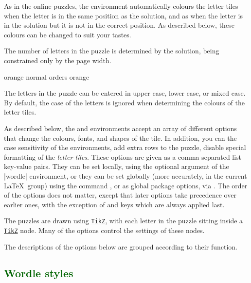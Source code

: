 \documentclass[svgnames]{report}
\newcommand\ctan[1]{\href{https://www.ctan.org/pkg/#1}{\texttt{#1}}}
\newcommand\Section[1]{\subsection{\textcolor{DarkGreen}{#1}}}
\begin{document}
  As in the online puzzles, the  environment
  automatically colours the letter tiles
  when the letter is in the same position as the solution, and as
   when
  the letter is in the solution but it is not in the correct position. As
  described below, these colours can be changed to suit your tastes.

  The number of letters in the puzzle is determined by the solution,
  being constrained only by the page width.

  \begin{example}
  \begin{wordle}[rows=4]{orange}
     normal
     orders
     orange
  \end{wordle}
  \end{example}

  The letters in the puzzle can be entered in upper case, lower case, or
  mixed case. By default, the case of the letters is ignored when
  determining the colours of the letter tiles.

  As described below, the  and 
  environments accept an array of different options that change the
  colours, fonts, and shapes of the tile. In addition, you can the case
  sensitivity of the environments, add extra rows to the puzzle, disable
  special formatting of the \textit{letter tiles}.  These options are
  given as a comma separated list key-value pairs.  They can be set
  locally, using the optional argument of the \keyword|wordle|
  environment, or they can be set globally (more accurately, in the
  current \LaTeX\ group) using the \keyword{\WordleSetup} command
  , or as global package options, via
  \keyword{\usepackage[options]{wordle}}.  The order of the options does
  not matter, except that later options take precedence over earlier
  ones, with the exception of  and  keys
  which are always applied last.

  The  puzzles are drawn using \ctan{TikZ}, with each
  letter in the puzzle sitting inside a \ctan{TikZ} node. Many of the
  options control the settings of these nodes.

  The descriptions of the options below are grouped according to their
  function.

  \Section{Wordle styles}
\end{document}
